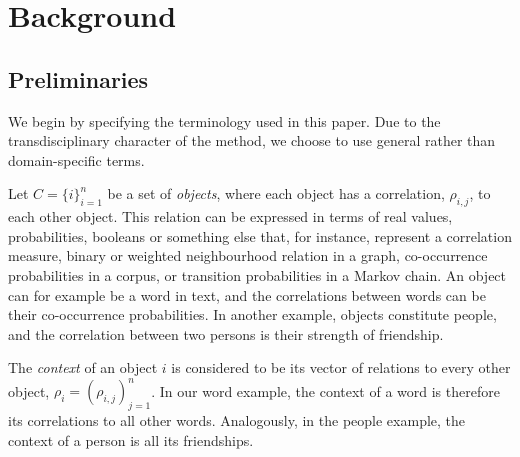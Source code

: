 \documentclass[conference]{IEEEtran}
\newcommand{\rn}[1]{\rho_{#1}}
\begin{document}
\section{Background}
\label{sec:background}

\subsection{Preliminaries}
\label{sec:preliminaries}

We begin by specifying the terminology used in this paper. Due to the transdisciplinary character of the method, we
 choose to use general rather than domain-specific terms.

Let $C = \{i\}_{i=1}^n$ be a set of \emph{objects}, where each object has a correlation, $\rn{i,j}$, to
each other object. This relation can be expressed in terms of real values, probabilities, booleans or something
else that, for instance, represent a correlation measure, binary or weighted neighbourhood relation in a graph,
co-occurrence probabilities in a corpus, or transition probabilities in a Markov chain. An object can for example be a 
word in text, and the correlations between words can be their co-occurrence probabilities. In another example, objects 
constitute people, and the correlation between two persons is their strength of friendship.

The \emph{context} of an object $i$ is considered to be its vector of relations to every other object, $\rn{i} =
(\rn{i,j})_{j=1}^n$. In our word example, the context of a word is therefore its correlations to all other words. Analogously, 
in the people example, the context of a person is all its friendships.
\end{document}
